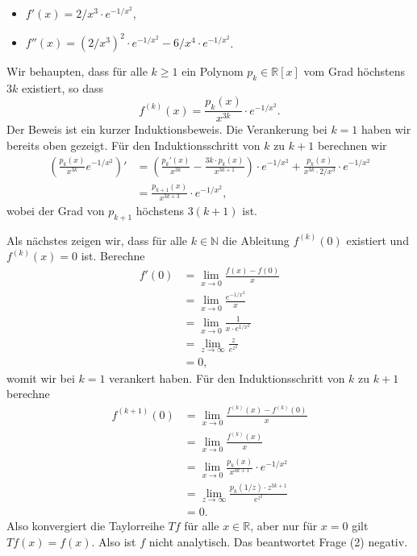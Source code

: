 \documentclass[../main.tex]{subfiles}
\begin{document}
\begin{examples}
\begin{enumerate}[(1)]
\begin{itemize}
        \item $f'(x) = 2/x^3 \cdot e^{-1/x^2}$,
        \item $f''(x) = {(2/x^3)}^2 \cdot e^{-1/x^2} - 6/x^4 \cdot e^{- 1/x^2}$.
      \end{itemize}
      Wir behaupten, dass für alle $k \geq 1$ ein Polynom $p_k \in \mathbb{R}[x]$ 
      vom Grad höchstens $3k$ existiert,
      so dass
      \[
        f^{(k)}(x) = \frac{p_k(x)}{x^{3k}} \cdot e^{-1/x^2}.
      \]
      Der Beweis ist ein kurzer Induktionsbeweis. Die Verankerung bei $k = 1$ 
      haben wir bereits oben gezeigt. Für den Induktionsschritt von $k$ zu
      $k + 1$ berechnen wir
      \begin{align*}
         \left( \frac{p_k(x)}{x^{3k}} e^{-1/x^2}\right)'
         &= \left( \frac{p_k'(x)}{x^{3k}} - \frac{3k \cdot p_k(x)}{x^{3k+1}} \right)
         \cdot e^{-1/x^2}
         + \frac{p_k(x)}{x^{3k} \cdot 2/x^3} \cdot e^{-1/x^2}\\
         &= \frac{p_{k+1}(x)}{x^{3k+3}} \cdot e^{-1/x^2},
      \end{align*}
      wobei der Grad von $p_{k+1}$ höchstens $3(k+1)$ ist.

      Als nächstes zeigen wir, dass für alle $k \in \mathbb{N}$ die Ableitung
      $f^{(k)}(0)$ existiert und $f^{(k)}(x) = 0$ ist.
      Berechne
      \begin{align*}
        f'(0)
        & = \lim_{x \to 0} \frac{f(x) - f(0)}{x}\\
        & = \lim_{x \to 0} \frac{e^{-1/x^2}}{x}\\
        & = \lim_{x \to 0} \frac{1}{x \cdot e^{1/x^2}} \\
        & = \lim_{z \to \infty} \frac{z}{e^{z^2}} \\
        & = 0,
      \end{align*}
      womit wir bei $k = 1$ verankert haben.
      Für den Induktionsschritt von $k$ zu $k + 1$ berechne
      \begin{align*}
        f^{(k+1)}(0)
        & = \lim_{x \to 0} \frac{f^{(k)}(x) - f^{(k)}(0)}{x}\\
        & = \lim_{x \to 0} \frac{f^{(k)}(x)}{x}\\
        & = \lim_{x \to 0} \frac{p_k(x)}{x^{3k+1}} \cdot e^{-1/x^2}\\
        & = \lim_{z \to \infty} \frac{p_k(1/z) \cdot z^{3k+1}}{e^{z^2}} \\
        & = 0.
      \end{align*}
      Also konvergiert die Taylorreihe $Tf$ für alle $x \in \mathbb{R}$,
      aber nur für $x = 0$ gilt $Tf(x) = f(x)$.
      Also ist $f$ nicht analytisch.
      Das beantwortet Frage (2) negativ.


\end{enumerate}
\end{examples}
\end{document}
